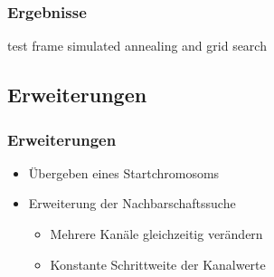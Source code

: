 \begin{frame}
\frametitle{Ergebnisse}

  test frame simulated annealing and grid search
\end{frame}

\subsection{Erweiterungen}

\begin{frame}
\frametitle{Erweiterungen}
    \begin{itemize}
        \item Übergeben eines Startchromosoms
        \item Erweiterung der Nachbarschaftssuche
            \begin{itemize}
                \item Mehrere Kanäle gleichzeitig verändern
                \item Konstante Schrittweite der Kanalwerte
            \end{itemize}
    \end{itemize}
\end{frame}
